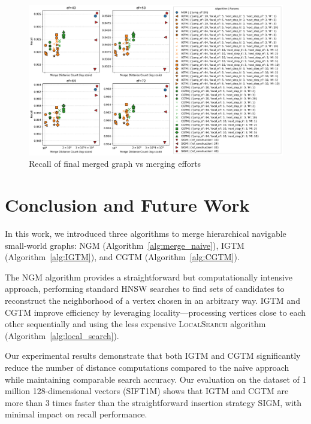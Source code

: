 \documentclass{article}
\begin{document}
\begin{figure}
  \centering
  \includegraphics[width=1.\linewidth]{figs/recall_vs_merge_distance_count.pdf}
  \caption{Recall of final merged graph vs merging efforts}
  \label{fig:recall_vs_merge}
\end{figure}

\section{Conclusion and Future Work}

In this work, we introduced three algorithms to merge hierarchical navigable small-world graphs: \textsc{NGM} (Algorithm~\ref{alg:merge_naive}), \textsc{IGTM} (Algorithm~\ref{alg:IGTM}), and \textsc{CGTM} (Algorithm~\ref{alg:CGTM}). 

The \textsc{NGM} algorithm provides a straightforward but computationally intensive approach, performing standard HNSW searches to find sets of candidates to reconstruct the neighborhood of a vertex chosen in an arbitrary way. \textsc{IGTM} and \textsc{CGTM} improve efficiency by leveraging locality—processing vertices close to each other sequentially and using the less expensive \textsc{LocalSearch} algorithm (Algorithm~\ref{alg:local_search}).

Our experimental results demonstrate that both \textsc{IGTM} and \textsc{CGTM} significantly reduce the number of distance computations compared to the naive approach while maintaining comparable search accuracy. Our evaluation on the dataset of 1 million 128-dimensional vectors (SIFT1M) shows that \textsc{IGTM} and \textsc{CGTM} are more than 3 times faster than the straightforward insertion strategy \textsc{SIGM}, with minimal impact on recall performance.
\end{document}
